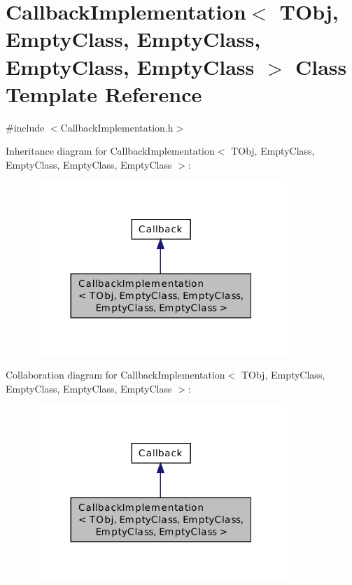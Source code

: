 \hypertarget{class_callback_implementation_3_01_t_obj_00_01_empty_class_00_01_empty_class_00_01_empty_class_00_01_empty_class_01_4}{\section{Callback\-Implementation$<$ T\-Obj, Empty\-Class, Empty\-Class, Empty\-Class, Empty\-Class $>$ Class Template Reference}
\label{class_callback_implementation_3_01_t_obj_00_01_empty_class_00_01_empty_class_00_01_empty_class_00_01_empty_class_01_4}
}


{\ttfamily \#include $<$Callback\-Implementation.\-h$>$}



Inheritance diagram for Callback\-Implementation$<$ T\-Obj, Empty\-Class, Empty\-Class, Empty\-Class, Empty\-Class $>$\-:\nopagebreak
\begin{figure}[H]
\begin{center}
\leavevmode
\includegraphics[width=272pt]{class_callback_implementation_3_01_t_obj_00_01_empty_class_00_01_empty_class_00_01_empty_class_01c3b10d1ec14b968434b1d347597626c}
\end{center}
\end{figure}


Collaboration diagram for Callback\-Implementation$<$ T\-Obj, Empty\-Class, Empty\-Class, Empty\-Class, Empty\-Class $>$\-:\nopagebreak
\begin{figure}[H]
\begin{center}
\leavevmode
\includegraphics[width=272pt]{class_callback_implementation_3_01_t_obj_00_01_empty_class_00_01_empty_class_00_01_empty_class_03f9499bed2ed57da5d92400c291eb13e}
\end{center}
\end{figure}
